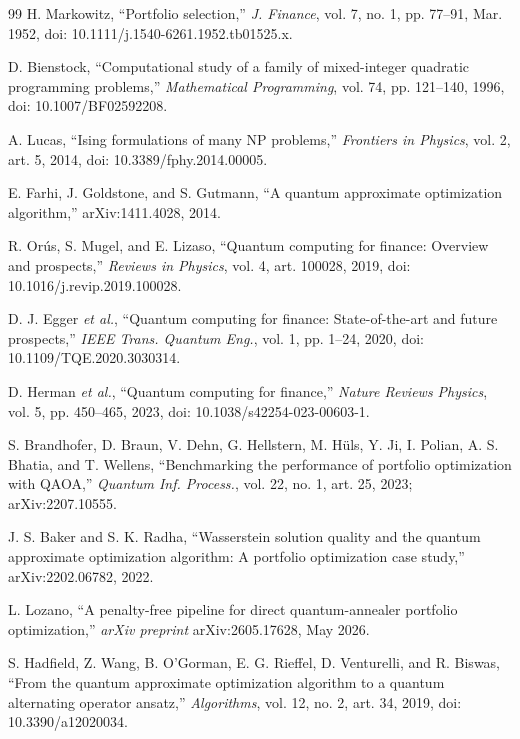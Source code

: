 \documentclass[journal]{IEEEtran}
\begin{document}
\begin{thebibliography}{99}
 H. Markowitz, ``Portfolio selection,'' \textit{J. Finance}, vol. 7, no. 1, pp. 77--91, Mar. 1952, doi: 10.1111/j.1540-6261.1952.tb01525.x.

 D. Bienstock, ``Computational study of a family of mixed-integer quadratic programming problems,'' \textit{Mathematical Programming}, vol. 74, pp. 121--140, 1996, doi: 10.1007/BF02592208.

 A. Lucas, ``Ising formulations of many NP problems,'' \textit{Frontiers in Physics}, vol. 2, art. 5, 2014, doi: 10.3389/fphy.2014.00005.

 E. Farhi, J. Goldstone, and S. Gutmann, ``A quantum approximate optimization algorithm,'' arXiv:1411.4028, 2014.

 R. Or\'{u}s, S. Mugel, and E. Lizaso, ``Quantum computing for finance: Overview and prospects,'' \textit{Reviews in Physics}, vol. 4, art. 100028, 2019, doi: 10.1016/j.revip.2019.100028.

 D. J. Egger \textit{et al.}, ``Quantum computing for finance: State-of-the-art and future prospects,'' \textit{IEEE Trans. Quantum Eng.}, vol. 1, pp. 1--24, 2020, doi: 10.1109/TQE.2020.3030314.

 D. Herman \textit{et al.}, ``Quantum computing for finance,'' \textit{Nature Reviews Physics}, vol. 5, pp. 450--465, 2023, doi: 10.1038/s42254-023-00603-1.

 S. Brandhofer, D. Braun, V. Dehn, G. Hellstern, M. H\"{u}ls, Y. Ji, I. Polian, A. S. Bhatia, and T. Wellens, ``Benchmarking the performance of portfolio optimization with QAOA,'' \textit{Quantum Inf. Process.}, vol. 22, no. 1, art. 25, 2023; arXiv:2207.10555.

 J. S. Baker and S. K. Radha, ``Wasserstein solution quality and the quantum approximate optimization algorithm: A portfolio optimization case study,'' arXiv:2202.06782, 2022.

 L. Lozano, ``A penalty-free pipeline for direct quantum-annealer portfolio optimization,'' \textit{arXiv preprint} arXiv:2605.17628, May 2026.

 S. Hadfield, Z. Wang, B. O'Gorman, E. G. Rieffel, D. Venturelli, and R. Biswas, ``From the quantum approximate optimization algorithm to a quantum alternating operator ansatz,'' \textit{Algorithms}, vol. 12, no. 2, art. 34, 2019, doi: 10.3390/a12020034.


\end{thebibliography}
\end{document}
